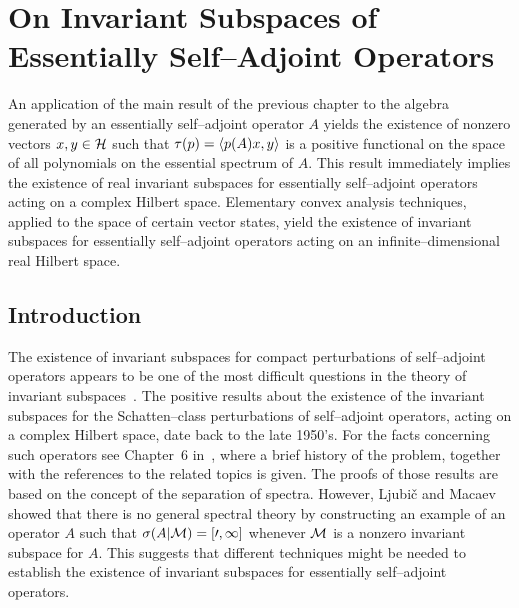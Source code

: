 \def\baselinestretch{1}

\chapter{On Invariant Subspaces of Essentially Self--Adjoint Operators}

\def\baselinestretch{1.66}


An application of the main result of the previous chapter to the algebra
generated by an essentially self--adjoint operator $A$ yields the existence
of nonzero vectors $x,y\in{\cal H}$ such that $\tau(p)=\left<p(A)x,y\right>$ is a positive
functional on the space of all polynomials on the essential spectrum of $A$.
This result immediately implies the existence of real invariant subspaces for
essentially self--adjoint operators acting on a complex Hilbert space.
Elementary convex analysis techniques, applied to the space of certain vector
states, yield the existence of invariant subspaces for essentially
self--adjoint operators acting on an infinite--dimensional real Hilbert
space.

\goodbreak
\section{Introduction}

The existence of invariant subspaces for compact perturbations of
self--adjoint operators appears to be one of the most difficult questions in
the theory of invariant subspaces~\cite{Lom92}. The positive results about
the existence of the invariant subspaces for the Schatten--class
perturbations of self--adjoint operators, acting on a complex Hilbert space,
date back to the late 1950's. For the facts concerning such operators see
Chapter~6 in~\cite{RR73}, where a brief history of the problem, together with
the references to the related topics is given. The proofs of those results
are based on the concept of the separation of spectra. However, Ljubi\v{c}
and Macaev~\cite{LM65} showed that there is no general spectral theory by
constructing an example of an operator $A$ such that
$\sigma(A|\cal{M})=[0,1]$ whenever $\cal{M}$ is a nonzero invariant subspace
for $A$. This suggests that different techniques might be needed to establish
the existence of invariant subspaces for essentially self--adjoint operators.

